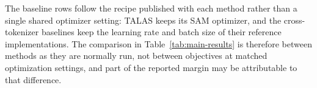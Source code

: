 The baseline rows follow the recipe published with each method rather than a
single shared optimizer setting: TALAS keeps its SAM optimizer, and the
cross-tokenizer baselines keep the learning rate and batch size of their
reference implementations. The comparison in Table~\ref{tab:main-results} is
therefore between methods as they are normally run, not between objectives at
matched optimization settings, and part of the reported margin may be
attributable to that difference.
